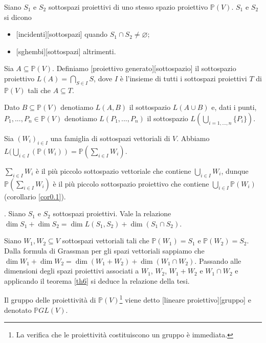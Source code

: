 \begin{Definition}\label{def8}
	Siano $S_1$ e $S_2$ sottospazi proiettivi di uno stesso spazio proiettivo $\mathbb{P}(V)$. $S_1$ e $S_2$ si dicono
	\begin{itemize}
		\item {}[incidenti][sottospazi] quando $S_1 \cap S_2 \neq \varnothing$;
		\item {}[sghembi][sottospazi] altrimenti.
	\end{itemize}
\end{Definition}
\begin{Definition}\label{def9}
	Sia $A \subseteq \mathbb{P}(V)$. Definiamo [proiettivo generato][sottospazio] il sottospazio proiettivo $L(A) = \bigcap_{S \in I} S$, dove $I$ \`e l'insieme di tutti i sottospazi proiettivi $T$ di $\mathbb{P}(V)$ tali che $A \subseteq T$.
	\par Dato $B \subseteq \mathbb{P}(V)$ denotiamo $L(A, B)$ il sottospazio $L(A \cup B)$ e, dati i punti, $P_1, ..., P_n \in \mathbb{P}(V)$ denotiamo $L(P_1, ..., P_n)$ il sottospazio $L(\bigcup_{i = 1, ..., n} \lbrace P_i \rbrace)$.
\end{Definition}
\begin{Theorem}\label{th6}
	Sia $(W_i)_{i \in I}$ una famiglia di sottospazi vettoriali di $V$. Abbiamo $L(\bigcup_{i \in I}(\mathbb{P}(W_i)) = \mathbb{P}(\sum_{i \in I} W_i)$.
\end{Theorem}
\Proof $\sum_{i \in I} W_i$ \`e il pi\`u piccolo sottospazio vettoriale che contiene $\bigcup_{i \in I} W_i$, dunque $\mathbb{P}(\sum_{i \in I} W_i)$ \`e il pi\`u piccolo sottospazio proiettivo che contiene $\bigcup_{i \in I} \mathbb{P}(W_i)$ (corollario \ref{cor0.1}). \EndProof
\begin{Theorem}\label{th7}
	. Siano $S_1$ e $S_2$ sottospazi proiettivi. Vale la relazione $\dim S_1 + \dim S_2 = \dim L(S_1, S_2) + \dim (S_1 \cap S_2)$.
\end{Theorem}
\Proof Siano $W_1, W_2 \subseteq V$ sottospazi vettoriali tali che $\mathbb{P}(W_1) = S_1$ e $\mathbb{P}(W_2) = S_2$. Dalla formula di Grassman per gli spazi vettoriali sappiamo che $\dim W_1 + \dim W_2 = \dim (W_1 + W_2) + \dim (W_1 \cap W_2)$. Passando alle dimensioni degli spazi proiettivi associati a $W_1$, $W_2$, $W_1 + W_2$ e $W_1 \cap W_2$ e applicando il teorema \ref{th6} si deduce la relazione della tesi. \EndProof
\begin{Definition}\label{def10}
	Il gruppo delle proiettivit\`a di $\mathbb{P}(V)$\footnote{La verifica che le proiettivit\`a costituiscono un gruppo \`e immediata.} viene detto [lineare proiettivo][gruppo] e denotato $\mathbb{P}GL(V)$.
\end{Definition}
